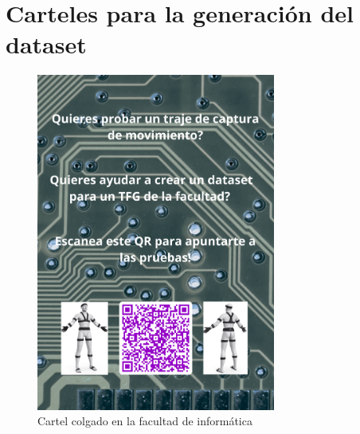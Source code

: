 \chapter{Carteles para la generación del dataset}
\label{Appendix:CartelesGenDataset}

\begin{figure}[H]
    \centering
    \includegraphics[width=0.7\textwidth]{Imagenes/Bitmap/cartel-imprimir.png}
    \caption{Cartel colgado en la facultad de informática}
    \label{fig:cartel-facultad}
\end{figure}

